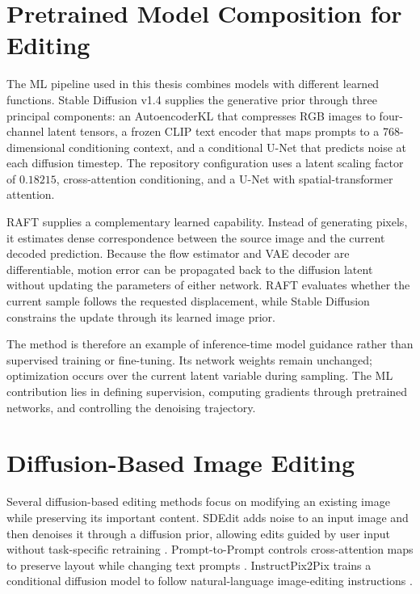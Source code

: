\section{Pretrained Model Composition for Editing}

The ML pipeline used in this thesis combines models with different learned functions. Stable Diffusion v1.4 supplies the generative prior through three principal components: an AutoencoderKL that compresses RGB images to four-channel latent tensors, a frozen CLIP text encoder that maps prompts to a 768-dimensional conditioning context, and a conditional U-Net that predicts noise at each diffusion timestep. The repository configuration uses a latent scaling factor of $0.18215$, cross-attention conditioning, and a U-Net with spatial-transformer attention.

RAFT supplies a complementary learned capability. Instead of generating pixels, it estimates dense correspondence between the source image and the current decoded prediction. Because the flow estimator and VAE decoder are differentiable, motion error can be propagated back to the diffusion latent without updating the parameters of either network. RAFT evaluates whether the current sample follows the requested displacement, while Stable Diffusion constrains the update through its learned image prior.

The method is therefore an example of inference-time model guidance rather than supervised training or fine-tuning. Its network weights remain unchanged; optimization occurs over the current latent variable during sampling. The ML contribution lies in defining supervision, computing gradients through pretrained networks, and controlling the denoising trajectory.

\section{Diffusion-Based Image Editing}

Several diffusion-based editing methods focus on modifying an existing image while preserving its important content. SDEdit adds noise to an input image and then denoises it through a diffusion prior, allowing edits guided by user input without task-specific retraining \cite{meng2022sdedit}. Prompt-to-Prompt controls cross-attention maps to preserve layout while changing text prompts \cite{hertz2022prompttoprompt}. InstructPix2Pix trains a conditional diffusion model to follow natural-language image-editing instructions \cite{brooks2023instructpix2pix}.

